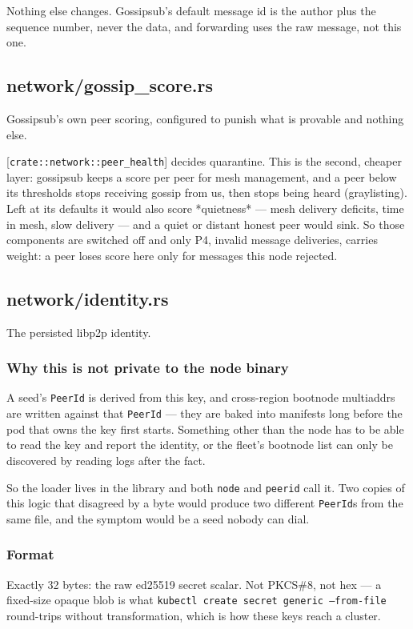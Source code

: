 \documentclass[11pt,a4paper]{article}
\begin{document}
Nothing else changes. Gossipsub's default message id is the author plus the
sequence number, never the data, and forwarding uses the raw message, not
this one.

\subsection{network/gossip\_score.rs}
Gossipsub's own peer scoring, configured to punish what is provable and
nothing else.

[\texttt{crate::network::peer\_health}] decides quarantine. This is the second,
cheaper layer: gossipsub keeps a score per peer for mesh management, and a
peer below its thresholds stops receiving gossip from us, then stops being
heard (graylisting). Left at its defaults it would also score *quietness* —
mesh delivery deficits, time in mesh, slow delivery — and a quiet or distant
honest peer would sink. So those components are switched off and only P4,
invalid message deliveries, carries weight: a peer loses score here only for
messages this node rejected.

\subsection{network/identity.rs}
The persisted libp2p identity.

\subsubsection{Why this is not private to the node binary}

A seed's \texttt{PeerId} is derived from this key, and cross-region bootnode
multiaddrs are written against that \texttt{PeerId} — they are baked into manifests
long before the pod that owns the key first starts. Something other than the
node has to be able to read the key and report the identity, or the fleet's
bootnode list can only be discovered by reading logs after the fact.

So the loader lives in the library and both \texttt{node} and \texttt{peerid} call it.
Two copies of this logic that disagreed by a byte would produce two different
\texttt{PeerId}s from the same file, and the symptom would be a seed nobody can dial.

\subsubsection{Format}

Exactly 32 bytes: the raw ed25519 secret scalar. Not PKCS\#8, not hex — a
fixed-size opaque blob is what \texttt{kubectl create secret generic --from-file}
round-trips without transformation, which is how these keys reach a cluster.
\end{document}
